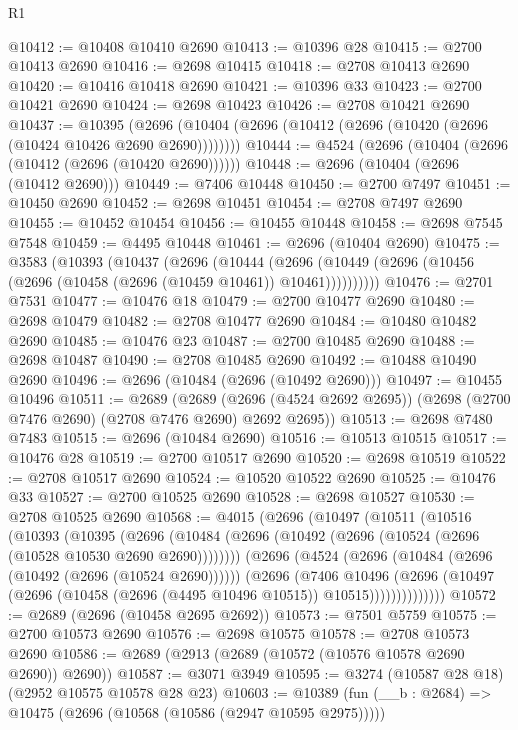 \begin{lexlean}{R1}
\begin{coremodule}
@10412 := @10408 @10410 @2690
@10413 := @10396 @28
@10415 := @2700 @10413 @2690
@10416 := @2698 @10415
@10418 := @2708 @10413 @2690
@10420 := @10416 @10418 @2690
@10421 := @10396 @33
@10423 := @2700 @10421 @2690
@10424 := @2698 @10423
@10426 := @2708 @10421 @2690
@10437 := @10395
    (@2696 (@10404 (@2696 (@10412 (@2696 (@10420 (@2696 (@10424 @10426 @2690 @2690))))))))
@10444 := @4524 (@2696 (@10404 (@2696 (@10412 (@2696 (@10420 @2690))))))
@10448 := @2696 (@10404 (@2696 (@10412 @2690)))
@10449 := @7406 @10448
@10450 := @2700 @7497
@10451 := @10450 @2690
@10452 := @2698 @10451
@10454 := @2708 @7497 @2690
@10455 := @10452 @10454
@10456 := @10455 @10448
@10458 := @2698 @7545 @7548
@10459 := @4495 @10448
@10461 := @2696 (@10404 @2690)
@10475 := @3583
    (@10393
      (@10437
        (@2696
          (@10444
            (@2696 (@10449 (@2696 (@10456 (@2696 (@10458 (@2696 (@10459 @10461)) @10461))))))))))
@10476 := @2701 @7531
@10477 := @10476 @18
@10479 := @2700 @10477 @2690
@10480 := @2698 @10479
@10482 := @2708 @10477 @2690
@10484 := @10480 @10482 @2690
@10485 := @10476 @23
@10487 := @2700 @10485 @2690
@10488 := @2698 @10487
@10490 := @2708 @10485 @2690
@10492 := @10488 @10490 @2690
@10496 := @2696 (@10484 (@2696 (@10492 @2690)))
@10497 := @10455 @10496
@10511 := @2689
    (@2689 (@2696 (@4524 @2692 @2695)) (@2698 (@2700 @7476 @2690) (@2708 @7476 @2690) @2692 @2695))
@10513 := @2698 @7480 @7483
@10515 := @2696 (@10484 @2690)
@10516 := @10513 @10515
@10517 := @10476 @28
@10519 := @2700 @10517 @2690
@10520 := @2698 @10519
@10522 := @2708 @10517 @2690
@10524 := @10520 @10522 @2690
@10525 := @10476 @33
@10527 := @2700 @10525 @2690
@10528 := @2698 @10527
@10530 := @2708 @10525 @2690
@10568 := @4015
    (@2696
      (@10497
        (@10511
          (@10516
            (@10393
              (@10395
                (@2696
                  (@10484 (@2696 (@10492 (@2696 (@10524 (@2696 (@10528 @10530 @2690 @2690))))))))
                (@2696
                  (@4524
                    (@2696 (@10484 (@2696 (@10492 (@2696 (@10524 @2690))))))
                    (@2696
                      (@7406
                        @10496
                        (@2696
                          (@10497 (@2696 (@10458 (@2696 (@4495 @10496 @10515)) @10515))))))))))))))
@10572 := @2689 (@2696 (@10458 @2695 @2692))
@10573 := @7501 @5759
@10575 := @2700 @10573 @2690
@10576 := @2698 @10575
@10578 := @2708 @10573 @2690
@10586 := @2689 (@2913 (@2689 (@10572 (@10576 @10578 @2690 @2690)) @2690))
@10587 := @3071 @3949
@10595 := @3274 (@10587 @28 @18) (@2952 @10575 @10578 @28 @23)
@10603 := @10389 (fun (__b : @2684) => @10475 (@2696 (@10568 (@10586 (@2947 @10595 @2975)))))

\end{coremodule}
\end{lexlean}
